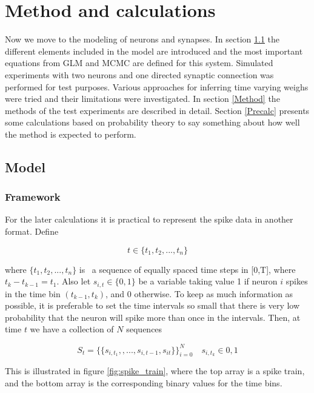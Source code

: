
\chapter{Method and calculations}

Now we move to the modeling of neurons and synapses. In section \ref{set_up} the different elements included in the model are introduced and the most important equations from GLM and MCMC are defined for this system. Simulated experiments with two neurons and one directed synaptic connection was performed for test purposes. Various approaches for inferring time varying weighs were tried and their limitations were investigated. In section \ref{Method} the methods of the test experiments are described in detail. Section \ref{Precalc} presents some calculations based on probability theory to say something about how well the method is expected to perform.

\section{Model}
\label{set_up}

\subsection{Framework}
For the later calculations it is practical to represent the spike data in another format. Define

\begin{equation}
    t \in \{t_1, t_2, ..., t_n\} 
\end{equation}

 where $\{t_1, t_2, ..., t_n\}$ is \ a sequence of equally spaced time steps in [0,T], where $t_{k}-t_{k-1} = t_1$. Also let $s_{i,t} \in \{0,1\}$ be a variable taking value 1 if neuron $i$ spikes in the time bin $(t_{k-1}, t_{k})$, and 0 otherwise. To keep as much information as possible, it is preferable to set the time intervals so small that there is very low probability that the neuron will spike more than once in the intervals. Then, at time $t$ we have a collection of $N$ sequences

\begin{equation}
    S_{t} = \{\{s_{i,t_1}, ,...,s_{i,t-1},s_{it}\}\}_{i=0}^{N} \quad s_{i,t_k} \in {0,1}
\end{equation}

This is illustrated in figure \ref{fig:spike_train}, where the top array is a spike train, and the bottom array is the corresponding binary values for the time bins.

